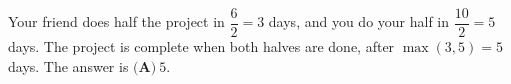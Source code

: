 Your friend does half the project in $\dfrac62=3$ days, and you do your half in $\dfrac{10}{2}=5$ days. The project is complete when both halves are done, after $\max(3,5)=5$ days. The answer is $\boxed{\textbf{(A)}\ 5}$.
